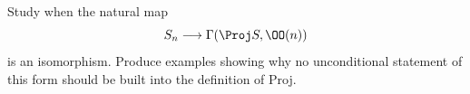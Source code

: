 \begin{problem}\label{chal:vi35-02}
Study when the natural map
\[
S_n\longrightarrow\Gamma(\Proj S,\OO(n))
\]
is an isomorphism. Produce examples showing why no unconditional statement of this form should be built into the definition of Proj.
\end{problem}
